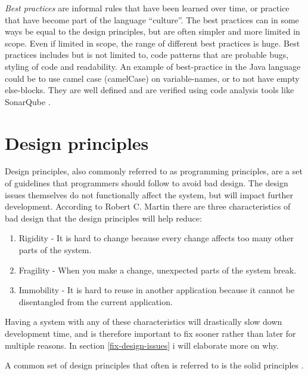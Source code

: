 \documentclass{report}
\begin{document}
\textit{Best practices} are informal rules that have been learned over time, or practice that have become part of the language ``culture''. The best practices can in some ways be equal to the design principles, but are often simpler and more limited in scope. Even if limited in scope, the range of different best practices is huge. Best practices includes but is not limited to, code patterns that are probable bugs, styling of code and readability. An example of best-practice in the Java language could be to use camel case (camelCase) \cite{camelcase} on variable-names, or to not have empty else-blocks. They are well defined and are verified using code analysis tools like SonarQube \cite{sonarqube}.

\section{Design principles}
\label{design-principles}
Design principles, also commonly referred to as programming principles, are a set of guidelines that programmers should follow to avoid bad design. The design issues themselves do not functionally affect the system, but will impact further development. According to Robert C. Martin \cite{robertcmartinprinciples} there are three characteristics of bad design that the design principles will help reduce:

\begin{enumerate}
	\item Rigidity - It is hard to change because every change affects too many other parts of the system.
	\item Fragility - When you make a change, unexpected parts of the system break.
	\item Immobility - It is hard to reuse in another application because it cannot be disentangled from the current application.
\end{enumerate}

Having a system with any of these characteristics will drastically slow down development time, and is therefore important to fix sooner rather than later for multiple reasons. In section \ref{fix-design-issues} i will elaborate more on why.

A common set of design principles that often is referred to is the \gls{solid} principles \cite{solid}.
\end{document}
